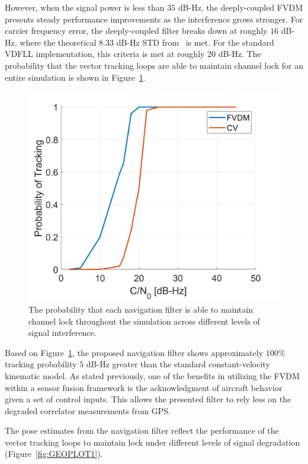 However, when the signal power is less than \(35\) dB-Hz, the deeply-coupled FVDM presents steady performance improvements as the interference grows stronger. For carrier frequency error, the deeply-coupled filter breaks down at roughly \(16\) dB-Hz, where the theoretical \(8.33\) dB-Hz STD from~\cite{lashleyPerformanceAnalysisVector2009} is met. For the standard VDFLL implementation, this criteria is met at roughly \(20\) dB-Hz. The probability that the vector tracking loops are able to maintain channel lock for an entire simulation is shown in Figure~\ref{fig:trackingprobability1}.

\begin{figure}[!ht]
    \centering
    \includegraphics[width=0.5\linewidth]{Figures/straight/trackingprobstraight.png}
    \caption{The probability that each navigation filter is able to maintain channel lock throughout the simulation across different levels of signal interference.}\label{fig:trackingprobability1}
\end{figure}

Based on Figure~\ref{fig:trackingprobability1}, the proposed navigation filter shows approximately \(100\% \) tracking probability \(5\) dB-Hz greater than the standard constant-velocity kinematic model. As stated previously, one of the benefits in utilizing the FVDM within a sensor fusion framework is the acknowledgment of aircraft behavior given a set of control inputs. This allows the presented filter to rely less on the degraded correlator measurements from GPS\@.

The pose estimates from the navigation filter reflect the performance of the vector tracking loops to maintain lock under different levels of signal degradation (Figure~\ref{fig:GEOPLOT1}).

